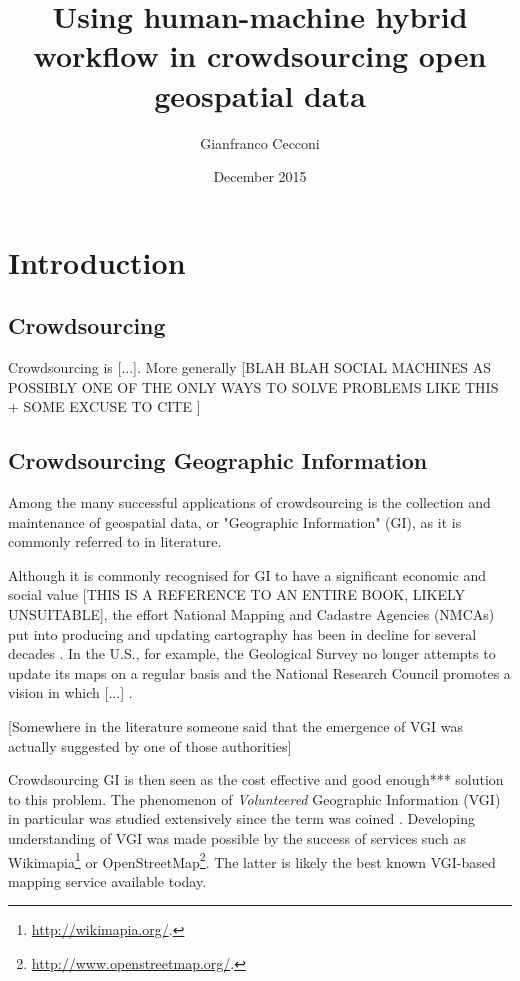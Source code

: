 \documentclass{llncs}
\title{Using human-machine hybrid workflow in crowdsourcing open geospatial data}
\author{Gianfranco Cecconi}
\institute{University of Southampton \email{gc1a13@soton.ac.uk}}
\date{December 2015}
\begin{document}
\maketitle

\section{Introduction}

\subsection{Crowdsourcing}

Crowdsourcing is {[}...{]}. More generally {[}BLAH BLAH SOCIAL MACHINES AS POSSIBLY ONE OF THE ONLY WAYS TO SOLVE PROBLEMS LIKE THIS + SOME EXCUSE TO CITE \cite{OReilly:2015uo}{]}

\subsection{Crowdsourcing Geographic Information}

Among the many successful applications of crowdsourcing is the collection and maintenance of geospatial data, or "Geographic Information" (GI), as it is commonly referred to in literature.

Although it is commonly recognised for GI to have a significant economic and social value \cite{Sui:2012uf}[THIS IS A REFERENCE TO AN ENTIRE BOOK, LIKELY UNSUITABLE], the effort National Mapping and Cadastre Agencies (NMCAs) put into producing and updating cartography has been in decline for several decades \cite{ESTES:1994vz}. In the U.S., for example, the Geological Survey no longer attempts to update its maps on a regular basis and the National Research Council promotes a vision in which {[}...{]} \cite{Committee:1993vp}.

{[}Somewhere in the literature someone said that the emergence of VGI was actually suggested by one of those authorities{]}

Crowdsourcing GI is then seen as the cost effective and good enough*** solution to this problem. The phenomenon of {\it Volunteered} Geographic Information (VGI) in particular was studied extensively since the term was coined \cite{Goodchild:2007vt}. Developing understanding of VGI was made possible by the success of services such as Wikimapia\footnote{\url{http://wikimapia.org/}.} or OpenStreetMap\footnote{\url{http://www.openstreetmap.org/}.}. The latter is likely the best known VGI-based mapping service available today.
\end{document}
